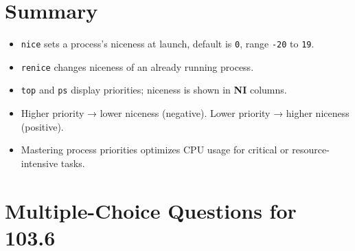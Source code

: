 \documentclass[a4paper]{report}
\begin{document}
\section*{Summary}
\begin{itemize}
    \item \texttt{nice} sets a process’s niceness at launch, default is \texttt{0}, range \texttt{-20} to \texttt{19}.
    \item \texttt{renice} changes niceness of an already running process.
    \item \texttt{top} and \texttt{ps} display priorities; niceness is shown in \textbf{NI} columns.
    \item Higher priority → lower niceness (negative). Lower priority → higher niceness (positive).
    \item Mastering process priorities optimizes CPU usage for critical or resource-intensive tasks.
\end{itemize}



\newpage
\section*{Multiple-Choice Questions for 103.6}
\end{document}
